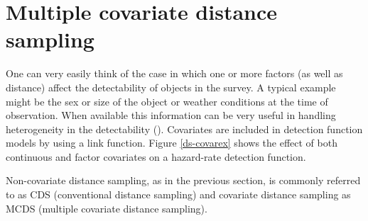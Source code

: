 \section{Multiple covariate distance sampling}
\label{intro-ds-covar}

One can very easily think of the case in which one or more factors (as well as distance) affect the detectability of objects in the survey. A typical example might be the sex or size of the object or weather conditions at the time of observation. When available this information can be very useful in handling heterogeneity in the detectability (\cite[p. 88]{IDS}). Covariates are included in detection function models by using a link function. Figure \ref{ds-covarex} shows the effect of both continuous and factor covariates on a hazard-rate detection function.

Non-covariate distance sampling, as in the previous section, is commonly referred to as CDS (conventional distance sampling) and covariate distance sampling as MCDS (multiple covariate distance sampling).

